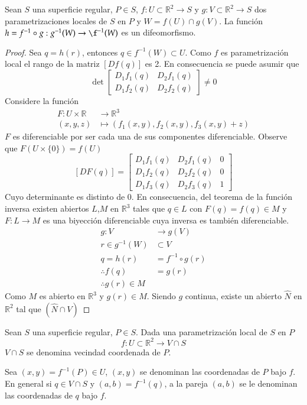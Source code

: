 \begin{proposition}
  Sean $S$ una superficie regular, $P \in S$, $f: U \subset \mathbb{R}^2 \to S$
  y $g:V \subset \mathbb{R}^2 \to S$ dos parametrizaciones locales de $S$ en $P$
  y $W = f(U) \cap g(V)$. La función $h = f^{-1} \circ g : g^{-1}(W) \to
  \f^{-1}(W)$ es un difeomorfismo.
\end{proposition}
\begin{proof}
  Sea $q = h(r)$, entonces $q \in f^{-1}(W) \subset U$. Como $f$ es
  parametrización local el rango de la  matriz $[Df(q)]$ es 2.
  En consecuencia se puede asumir que
  \[
     \det \begin{bmatrix} D_1f_1(q) & D_2f_1(q) \\
     D_1f_2(q) & D_2f_2(q) \end{bmatrix} \neq 0
  \]
Considere la función
\begin{align*}
  F: U \times \mathbb{R} &\to \mathbb{R}^3 \\
  (x,y,z) &\mapsto (f_1(x,y), f_2(x,y), f_3(x,y) + z)
\end{align*}
$F$ es diferenciable por ser cada una de sus componentes diferenciable.
Observe que $F(U \times \{0\}) = f(U)$
\[
  [DF(q)] = \begin{bmatrix} D_1f_1(q) & D_2f_1(q) & 0 \\
 D_1f_2(q) & D_2f_2(q) & 0 \\
 D_1f_3(q) & D_2f_3(q) & 1 
  \end{bmatrix} 
\]
Cuyo determinante es distinto de 0.
En consecuencia, del teorema de la función inversa existen abiertos $L$,$M$ en
$\mathbb{R}^3$ tales que $q \in L$ con $F(q) = f(q) \in M$ y $F:L \to M$ es una
biyección diferenciable cuya inversa es también diferenciable.
\begin{align*}
  g: V &\to g(V) \\
  r \in g^{-1}(W) &\subset V \\
  q = h(r) &= f^{-1} \circ g(r) \\
  \therefore f(q) &= g(r) \\
  \therefore g(r) \in M
\end{align*}
Como $M$ es abierto en $\mathbb{R}^3$ y $g(r) \in M$. Siendo $g$ continua,
existe un abierto $\hat{N}$ en $\mathbb{R}^2$ tal que $(\hat{N} \cap V)$
\end{proof}
\begin{definition}
 Sean $S$ una superficie regular, $P \in S$. Dada una parametrización local de
 $S$ en $P$
 \[
   f:U\subset \mathbb{R}^2 \to V \cap S
 \]
 $V \cap S$ se denomina vecindad coordenada de $P$.


Sea $(x,y) = f^{-1}(P) \in U$, $(x,y)$ se denominan las coordenadas de $P$ bajo
$f$. En general si $q \in V \cap S$ y $(a,b) = f^{-1}(q)$, a la pareja $(a,b)$
se le denominan las coordenadas de $q$ bajo $f$.
\end{definition}
